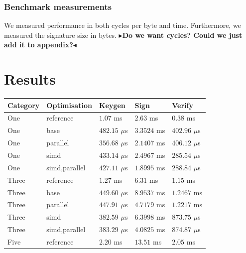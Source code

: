 \documentclass[11pt]{report}
\theoremstyle{definition}
\theoremstyle{plain}
\newcommand{\todo}[1]{{\color[rgb]{.5,0,0}\textbf{$\blacktriangleright$#1$\blacktriangleleft$}}}
\begin{document}
\subsubsection{Benchmark measurements}\label{sub:bench_measurements}
We measured performance in both cycles per byte and time. Furthermore, we measured the signature size in bytes. \todo{Do we want cycles? Could we just add it to appendix?}

\section{Results}\label{sub:results}

\begin{table}[H]
  \centering
  \begin{tabular}{l|l|lll}
    \hline
    Category                       & Optimisation  & Keygen          & Sign        & Verify          \\
    \hline
    \hline
    One \cite{aguilar2023return}   & reference     & $1.07$ ms       & $2.63$ ms   & $0.38$ ms       \\
    \arrayrulecolor{lightgray}\hline\arrayrulecolor{black}
    One                            & base          & $482.15$ $\mu$s & $3.3524$ ms & $402.96$ $\mu$s \\
    One                            & parallel      & $356.68$ $\mu$s & $2.1407$ ms & $406.12$ $\mu$s \\
    One                            & simd          & $433.14$ $\mu$s & $2.4967$ ms & $285.54$ $\mu$s \\
    One                            & simd,parallel & $427.11$ $\mu$s & $1.8995$ ms & $288.84$ $\mu$s \\
    \hline
    Three \cite{aguilar2023return} & reference     & $1.27$ ms       & $6.31$ ms   & $1.15$ ms       \\
    \arrayrulecolor{lightgray}\hline\arrayrulecolor{black}
    Three                          & base          & $449.60$ $\mu$s & $8.9537$ ms & $1.2467$ ms     \\
    Three                          & parallel      & $447.91$ $\mu$s & $4.7179$ ms & $1.2217$ ms     \\
    Three                          & simd          & $382.59$ $\mu$s & $6.3998$ ms & $873.75$ $\mu$s \\
    Three                          & simd,parallel & $383.29$ $\mu$s & $4.0825$ ms & $874.87$ $\mu$s \\
    \hline
    Five \cite{aguilar2023return}  & reference     & $2.20$ ms       & $13.51$ ms  & $2.05$ ms       \\

\end{tabular}
\end{table}
\end{document}
